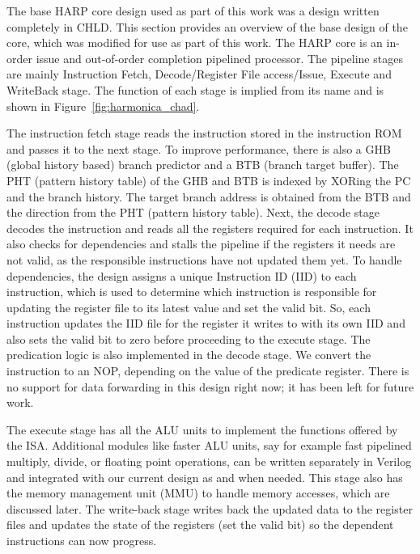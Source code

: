 The base HARP core design used as part of this work was a design written completely in CHLD. This section provides an overview of the base design of the core, which was modified for use as part of this work. The HARP core is an in-order issue and out-of-order completion pipelined processor. The pipeline stages are mainly Instruction Fetch, Decode/Register File access/Issue, Execute and WriteBack stage. The function of each stage is implied from its name and is shown in Figure~\ref{fig:harmonica_chad}. 

The instruction fetch stage reads the instruction stored in the instruction ROM and passes it to the next stage. To improve performance, there is also a GHB (global history based) branch predictor and a BTB (branch target buffer). The PHT (pattern history table) of the GHB and BTB is indexed by XORing the PC and the branch history. The target branch address is obtained from the BTB and the direction from the PHT (pattern history table). Next, the decode stage decodes the instruction and reads all the registers required for each instruction. It also checks for dependencies and stalls the pipeline if the registers it needs are not valid, as the responsible instructions have not updated them yet. To handle dependencies, the design assigns a unique Instruction ID (IID) to each instruction, which is used to determine which instruction is responsible for updating the register file to its latest value and set the valid bit. So, each instruction updates the IID file for the register it writes to with its own IID and also sets the valid bit to zero before proceeding to the execute stage. The predication logic is also implemented in the decode stage. We convert the instruction to an NOP, depending on the value of the predicate register. There is no support for data forwarding in this design right now; it has been left for future work. 

The execute stage has all the ALU units to implement the functions offered by the ISA. Additional modules like faster ALU units, say for example fast pipelined multiply, divide, or floating point operations, can be written separately in Verilog and integrated with our current design as and when needed. This stage also has the memory management unit (MMU) to handle memory accesses, which are discussed later. %
The write-back stage writes back the updated data to the register files and updates the state of the registers (set the valid bit) so the dependent instructions can now progress.

